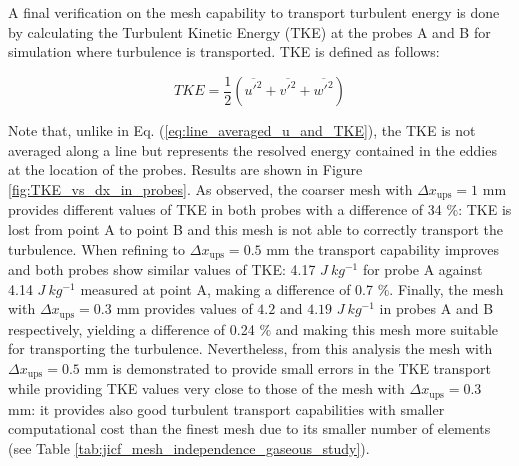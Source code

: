 \clearpage



A final verification on the mesh capability to transport turbulent energy is done by calculating the Turbulent Kinetic Energy (TKE) at the probes A and B for simulation where turbulence is transported. TKE is defined as follows:

\begin{equation}
TKE = \frac{1}{2} \left( \overline{u'^2} + \overline{v'^2} + \overline{w'^2} \right)
\end{equation}

Note that, unlike in Eq. (\ref{eq:line_averaged_u_and_TKE}), the TKE is not averaged along a line but represents the resolved energy contained in the eddies at the location of the probes. 
Results are shown in Figure \ref{fig:TKE_vs_dx_in_probes}. As observed, the coarser mesh with $\Delta x_\mathrm{ups} = 1$ mm provides different values of TKE in both probes with a difference of 34 $\%$: TKE is lost from point A to point B and this mesh is not able to correctly transport the turbulence. When refining to $\Delta x_\mathrm{ups} = 0.5$ mm the transport capability improves and both probes show similar values of TKE: 4.17 $J ~ kg^{-1}$ for probe A against 4.14 $J ~ kg^{-1}$ measured at point A, making a difference of 0.7 $\%$. Finally, the mesh with $\Delta x_\mathrm{ups} = 0.3$ mm provides values of $4.2$ and $4.19$ $J ~ kg^{-1}$ in probes A and B respectively, yielding a difference of 0.24 $\%$ and making this mesh more suitable for transporting the turbulence. Nevertheless, from this analysis the mesh with $\Delta x_\mathrm{ups} = 0.5$ mm is demonstrated to provide small errors in the TKE transport while providing TKE values very close to those of the mesh with $\Delta x_\mathrm{ups} = 0.3$ mm: it provides also good turbulent transport capabilities with smaller computational cost than the finest mesh due to its smaller number of elements (see Table \ref{tab:jicf_mesh_independence_gaseous_study}). \\



